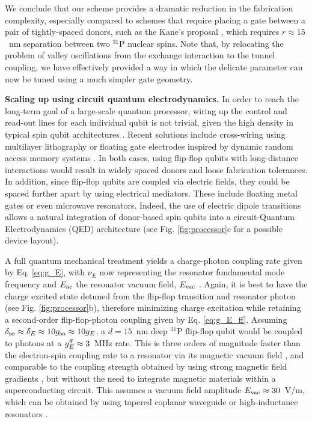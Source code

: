 \documentclass[aps,prb,superscriptaddress,nobibnotes,twocolumn]{revtex4-1}
\begin{document}
We conclude that our scheme provides a dramatic reduction in the fabrication complexity, especially compared to schemes that require placing a gate between a pair of tightly-spaced donors, such as the Kane's proposal \cite{Kane1998}, which requires $r\approx15$~nm separation between two $^{31}$P nuclear spins. Note that, by relocating the problem of valley oscillations from the exchange interaction \cite{Kane1998} to the tunnel coupling, we have effectively provided a way in which the delicate parameter can now be tuned using a much simpler gate geometry.


\vspace{3mm}
\noindent\textbf{Scaling up using circuit quantum electrodynamics.}
%
In order to reach the long-term goal of a large-scale quantum processor, wiring up the control and read-out lines for each individual qubit is not trivial, given the high density in typical spin qubit architectures \cite{Vandersypen2016}. Recent solutions include cross-wiring using multilayer lithography \cite{Hill2015} or floating gate electrodes inspired by dynamic random access memory systems \cite{Veldhorst2016}. In both cases, using flip-flop qubits with long-distance interactions would result in widely spaced donors and loose fabrication tolerances. In addition, since flip-flop qubits are coupled via electric fields, they could be spaced further apart by using electrical mediators. These include floating metal gates \cite{Trifunovic2012} or even microwave resonators. Indeed, the use of electric dipole transitions allows a natural integration of donor-based spin qubits into a circuit-Quantum Electrodynamics (QED) architecture \cite{Blais2004,Childress2004,Xiang2013,Mi2016} (see Fig. \ref{fig:processor}c for a possible device layout).

A full quantum mechanical treatment yields a charge-photon coupling rate given by Eq. \ref{eq:g_E}, with $\nu_E$ now representing the resonator fundamental mode frequency and $E_{\rm ac}$ the resonator vacuum field, $E_{\rm vac}$ . Again, it is best to have the charge excited state detuned from the flip-flop transition and resonator photon (see Fig. \ref{fig:processor}b), therefore minimizing charge excitation while retaining a second-order flip-flop-photon coupling given by Eq. \ref{eq:g_E_ff}. Assuming $\delta_{\rm so}\approx\delta_E\approx 10g_{\rm so}\approx 10g_E$, a $d=15$~nm deep $^{31}$P flip-flop qubit would be coupled to photons at a $g^{\rm ff}_E\approx3$~MHz rate. This is three orders of magnitude faster than the electron-spin coupling rate to a resonator via its magnetic vacuum field \cite{Tosi2014,Haikka2017}, and comparable to the coupling strength obtained by using strong magnetic field gradients \cite{Hu2012,Viennot2015}, but without the need to integrate magnetic materials within a superconducting circuit. This assumes a vacuum field amplitude $E_{\rm vac}\approx 30$~V/m, which can be obtained by using tapered coplanar waveguide or high-inductance resonators \cite{Samkharadze2016}.
\end{document}
